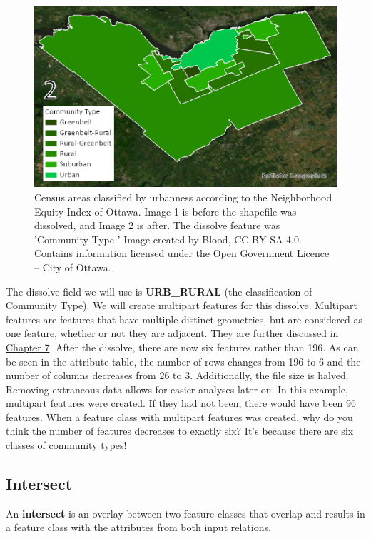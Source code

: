 \documentclass[
]{book}
\begin{document}
\begin{figure}
\includegraphics[width=0.75\linewidth]{images/06-dissolve} \caption{Census areas classified by urbanness according to the Neighborhood Equity Index of Ottawa. Image 1 is before the shapefile was dissolved, and Image 2 is after. The dissolve feature was 'Community Type ' Image created by Blood, CC-BY-SA-4.0. Contains information licensed under the Open Government Licence – City of Ottawa.}\label{fig:6-dissolve}
\end{figure}

The dissolve field we will use is \textbf{URB\_RURAL} (the classification of Community Type). We will create multipart features for this dissolve. Multipart features are features that have multiple distinct geometries, but are considered as one feature, whether or not they are adjacent. They are further discussed in \href{https://www.opengeomatics.ca/topology-and-geocoding.html\#multipart-geometry}{Chapter 7}. After the dissolve, there are now six features rather than 196. As can be seen in the attribute table, the number of rows changes from 196 to 6 and the number of columns decreases from 26 to 3.
Additionally, the file size is halved. Removing extraneous data allows for easier analyses later on. In this example, multipart features were created. If they had not been, there would have been 96 features. When a feature class with multipart features was created, why do you think the number of features decreases to exactly six? It's because there are six classes of community types!

\hypertarget{intersect}{%
\subsection{Intersect}\label{intersect}}

An \textbf{intersect} is an overlay between two feature classes that overlap and results in a feature class with the attributes from both input relations.
\end{document}
